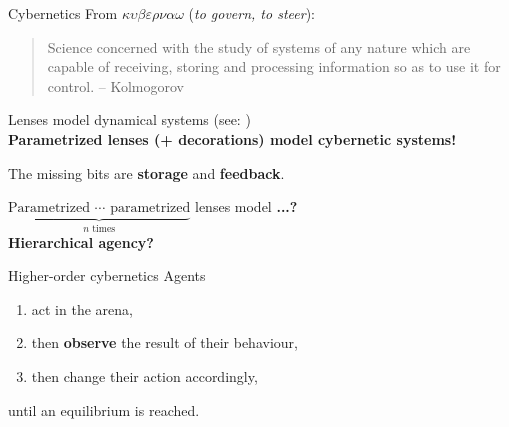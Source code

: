 \begin{framecard}
	{\color{white}
	\bfseries

	}
\end{framecard}

\begin{frame}{Cybernetics}
	From $\kappa\upsilon\beta\varepsilon\rho\nu\alpha\omega$ (\emph{to govern, to steer}):
	\vfill

	\begin{quotation}
		Science concerned with the study of systems of any nature which are capable of receiving, storing and processing information so as to use it for control.
		{\color{colornote}-- Kolmogorov}
	\end{quotation}

	Lenses model dynamical systems (see: \cite{myers2020double})\\
	\textbf{\color{coloraccent}Parametrized lenses (+ decorations) model cybernetic systems!}

	\vfill
	The missing bits are \textbf{storage} and \textbf{feedback}.

	\vfill
	{\color{colornote}
	$\underbrace{\text{Parametrized $\cdots$ parametrized}}_{\text{$n$ times}}$ lenses model \textbf{...?}\\[1.5ex]
		\hspace{5ex} \textbf{Hierarchical agency?}
	}
\end{frame}

\begin{frame}{Higher-order cybernetics}
	Agents
	\begin{enumerate}
		\item act in the arena,
		\item then \textbf<2->{observe} the result of their behaviour,
		\item then change their action accordingly,
	\end{enumerate}
	until an equilibrium is reached.

\end{frame}

